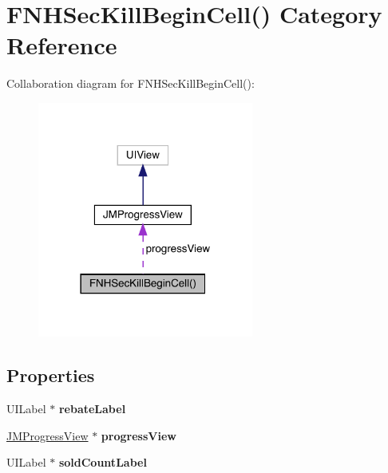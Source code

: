 \hypertarget{category_f_n_h_sec_kill_begin_cell_07_08}{}\section{F\+N\+H\+Sec\+Kill\+Begin\+Cell() Category Reference}
\label{category_f_n_h_sec_kill_begin_cell_07_08}


Collaboration diagram for F\+N\+H\+Sec\+Kill\+Begin\+Cell()\+:\nopagebreak
\begin{figure}[H]
\begin{center}
\leavevmode
\includegraphics[width=201pt]{category_f_n_h_sec_kill_begin_cell_07_08__coll__graph}
\end{center}
\end{figure}
\subsection*{Properties}
\begin{DoxyCompactItemize}
\item 
\mbox{\label{category_f_n_h_sec_kill_begin_cell_07_08_a933ab06a423c22d8f3bf881209adca0e}} 
U\+I\+Label $\ast$ {\bfseries rebate\+Label}
\item 
\mbox{\label{category_f_n_h_sec_kill_begin_cell_07_08_a5061510a9b4247081b0c6c678873d326}} 
\mbox{\hyperlink{interface_j_m_progress_view}{J\+M\+Progress\+View}} $\ast$ {\bfseries progress\+View}
\item 
\mbox{\label{category_f_n_h_sec_kill_begin_cell_07_08_a8fff68589cc9350c669417c9323eb58f}} 
U\+I\+Label $\ast$ {\bfseries sold\+Count\+Label}
\end{DoxyCompactItemize}



